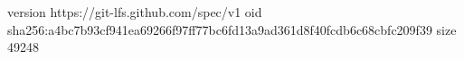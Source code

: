 version https://git-lfs.github.com/spec/v1
oid sha256:a4bc7b93cf941ea69266f97ff77bc6fd13a9ad361d8f40fcdb6c68cbfc209f39
size 49248
